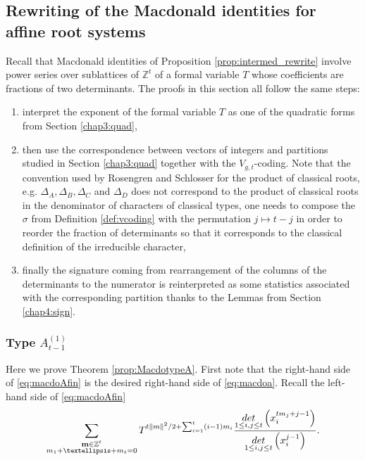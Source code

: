 \documentclass[11pt,letterpaper]{amsart}
\def\bbbz{\mathbb Z}
\def\det{{\rm det}}
\numberwithin{equation}{section}
\numberwithin{df}{section}
\begin{document}
\subsection{Rewriting of the Macdonald identities for affine root systems}\label{sec:Macdo}
%
Recall that Macdonald identities of Proposition \ref{prop:intermed_rewrite} involve power series over sublattices of $\bbbz^t$ of a formal variable $T$ whose coefficients are fractions of two determinants. The proofs in this section all follow the same steps:
\begin{enumerate}
\item interpret the exponent of the formal variable $T$ as one of the quadratic forms from Section \ref{chap3:quad},
\item then use the correspondence between vectors of integers and partitions studied in Section \ref{chap3:quad} together with the $V_{g,t}$-coding. Note that the convention used by Rosengren and Schlosser for the product of classical roots, e.g. $\Delta_A, \Delta_B, \Delta_C$ and $\Delta_D$ does not correspond to the product of classical roots in the denominator of characters of classical types, one needs to compose the $\sigma$ from Definition \ref{def:vcoding} with the permutation $j\mapsto t-j$ in order to reorder the fraction of determinants so that it corresponds to the classical definition of the irreducible character,
\item finally the signature coming from rearrangement of the columns of the determinants to the numerator is reinterpreted as some statistics associated with the corresponding partition thanks to the Lemmas from Section \ref{chap4:sign}.
\end{enumerate}


\subsubsection{Type $A^{(1)}_{t-1}$}

Here we prove Theorem \ref{prop:MacdotypeA}. First note that the right-hand side of \eqref{eq:macdoAfin} is the desired right-hand side of \eqref{eq:macdoa}. Recall the left-hand side of \eqref{eq:macdoAfin}
\begin{equation}\label{eq:macdoAlhs}
\sum_{\substack{\mathbf{m}\in\bbbz^t\\m_1+\dots+m_t=0}}T^{t\lVert m\rVert^2/2+\sum_{i=1}^t(i-1)m_i}\frac{\underset{1\le i,j\le t}{\det}\left(x_i^{tm_j+j-1}\right)}{\underset{1\le i,j\le t}{\det}\left(x_i^{j-1}\right)}.
\end{equation}
\end{document}
